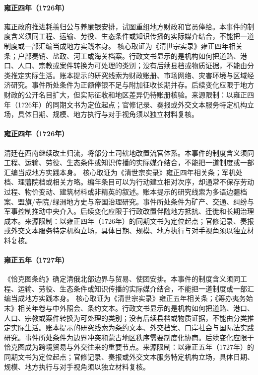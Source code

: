 \hypertarget{civic:EQ-1726-HAOXIAN-GUIGONG}{}\paragraph{雍正四年（1726年）}雍正政府推进耗羡归公与养廉银安排，试图重组地方财政和官员俸给。本事件的制度含义须同工程、运输、劳役、生态条件或知识传播的实际媒介结合，不能把一道制度或一部汇编当成地方实践本身。 核心取证为《清世宗实录》雍正四年相关条；户部奏销、盐政、河工或海关档案。行政文书显示的是机构如何把道路、港口、人口、宗教或案件转换为可处理的类别；没有后续县档或物质证据，不能由分类推定实际生活。账本提示的研究线索为财政账册、市场网络、灾害环境与区域经济研究。事件所处条件为正额俸银不足与附加征收长期并存。后续变化应限于地方财政的公开名目扩大，但实际征收和地区差异仍待账册核验。来源限制：以雍正四年（1726年）的同期文书为定位起点；官修记录、奏报或外交文本服务特定机构立场，具体日期、规模、地方执行与对手视角须以独立材料复核。
\hypertarget{civic:EQ-1726-Gaitu-Guiliu-SOUTHWEST}{}\paragraph{雍正四年（1726年）}清廷在西南继续改土归流，将部分土司辖地改置流官体系。本事件的制度含义须同工程、运输、劳役、生态条件或知识传播的实际媒介结合，不能把一道制度或一部汇编当成地方实践本身。 核心取证为《清世宗实录》雍正四年相关条；军机处档、理藩院档或相关方略。编年条目可以为行动建立相对次序，却通常不保存劳动过程、物价变动、建筑材料或非精英的叙述。账本提示的研究线索为多语边疆档案、盟旗/寺院/绿洲地方史与帝国治理研究。事件所处条件为矿产、交通、纠纷与军事控制推动中央介入。后续变化应限于行政改置伴随地方抵抗、迁徙和长期治理成本。来源限制：以雍正四年（1726年）的同期文书为定位起点；官修记录、奏报或外交文本服务特定机构立场，具体日期、规模、地方执行与对手视角须以独立材料复核。
\hypertarget{civic:EQ-1727-KYAKHTA-TREATY}{}\paragraph{雍正五年（1727年）}《恰克图条约》确定清俄北部边界与贸易、使团安排。本事件的制度含义须同工程、运输、劳役、生态条件或知识传播的实际媒介结合，不能把一道制度或一部汇编当成地方实践本身。 核心取证为《清世宗实录》雍正五年相关条；《筹办夷务始末》相关年卷与中外照会、条约文本。行政文书显示的是机构如何把道路、港口、人口、宗教或案件转换为可处理的类别；没有后续县档或物质证据，不能由分类推定实际生活。账本提示的研究线索为条约文本、外交档案、口岸社会与国际法实践研究。事件所处条件为边界冲突和蒙古地区秩序需要制度化协商。后续变化应限于恰克图成为跨境贸易与外交往来的重要节点。来源限制：以雍正五年（1727年）的同期文书为定位起点；官修记录、奏报或外交文本服务特定机构立场，具体日期、规模、地方执行与对手视角须以独立材料复核。
